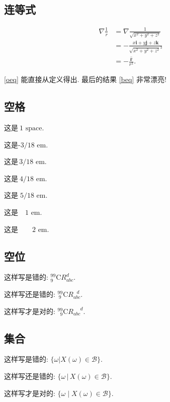 \documentclass{ctexart}
\begin{document}
    \subsection{连等式}
    \begin{align}
        \nabla\frac{1}{r} & = \nabla\frac{1}{\sqrt{x^2+y^2+z^2}} \label{oeq}\\
            & = -\frac{x\boldsymbol{i}+y\boldsymbol{j}+z\boldsymbol{k}}
                      {\sqrt{x^2+y^2+z^2}^3} \nonumber \\
            & = -\frac{\hat{\boldsymbol{r}}}{r^2}. \tag{$\star$} \label{beq}
    \end{align}

    \eqref{oeq} 能直接从定义得出. 最后的结果 \eqref{beq} 非常漂亮!
    \subsection{空格}
    $ \text{这是} \  \text{1 space.} $

    $ \text{这是} \! \text{-3/18 em.} $

    $ \text{这是} \, \text{3/18 em.} $

    $ \text{这是} \: \text{4/18 em.} $

    $ \text{这是} \; \text{5/18 em.} $

    $ \text{这是} \quad \text{1 em.} $

    $ \text{这是} \qquad \text{2 em.} $
    \subsection{空位}
    这样写是错的: ${}^{99}_{ 9}\text{C}R_{abc}^{   d}$.

    这样写还是错的: ${}^{99}_{\ 9}\text{C}R_{abc}^{\ \ \ d}$.

    这样写才是对的: ${}^{99}_{\phantom{9}9}\text{C}R_{abc}^{\phantom{abc}d}$.
    \subsection{集合}
    这样写是错的: $\{\omega|X(\omega)\in\mathcal{B}\}$.

    这样写还是错的: $\{\omega\,|\,X(\omega)\in\mathcal{B}\}$.

    这样写才是对的: $\{\omega\mid X(\omega)\in\mathcal{B}\}$.
\end{document}

